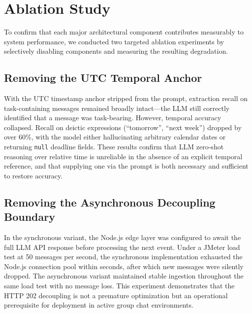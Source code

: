 \section{Ablation Study}
\label{sec:ablation_study}

To confirm that each major architectural component contributes measurably to system performance, we conducted two targeted ablation experiments by selectively disabling components and measuring the resulting degradation.

\subsection{Removing the UTC Temporal Anchor}
With the UTC timestamp anchor stripped from the prompt, extraction recall on task-containing messages remained broadly intact—the LLM still correctly identified that a message was task-bearing. However, temporal accuracy collapsed. Recall on deictic expressions (``tomorrow'', ``next week'') dropped by over 60\%, with the model either hallucinating arbitrary calendar dates or returning \texttt{null} deadline fields. These results confirm that LLM zero-shot reasoning over relative time is unreliable in the absence of an explicit temporal reference, and that supplying one via the prompt is both necessary and sufficient to restore accuracy.

\subsection{Removing the Asynchronous Decoupling Boundary}
In the synchronous variant, the Node.js edge layer was configured to await the full LLM API response before processing the next event. Under a JMeter load test at 50 messages per second, the synchronous implementation exhausted the Node.js connection pool within seconds, after which new messages were silently dropped. The asynchronous variant maintained stable ingestion throughout the same load test with no message loss. This experiment demonstrates that the HTTP 202 decoupling is not a premature optimization but an operational prerequisite for deployment in active group chat environments.
